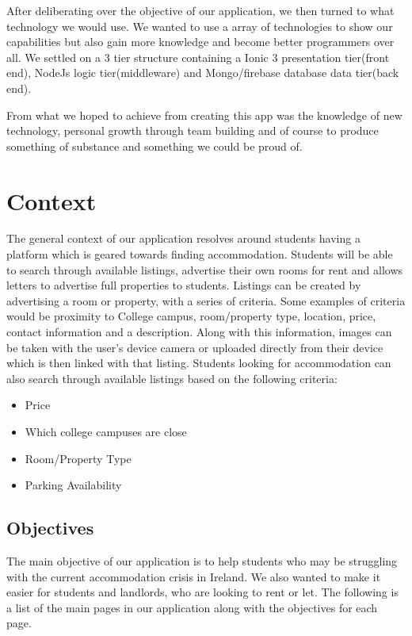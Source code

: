 After deliberating over the objective of our application, we then turned to what technology we would use. We wanted to use a array of technologies to show our capabilities but also gain more knowledge and become better programmers over all. We settled on a 3 tier structure containing a Ionic 3 presentation tier(front end), NodeJs logic tier(middleware)  and Mongo/firebase database data tier(back end).

From what we hoped to achieve from creating this app was the knowledge of new technology, personal growth through team building and of course to produce something of substance and something we could be proud of.

\chapter{Context}
The general context of our application resolves around students having a platform which is geared towards finding accommodation. Students will be able to search through available listings, advertise their own rooms for rent and allows letters to advertise full properties to students. Listings can be created by advertising a room or property, with a series of criteria. Some examples of criteria would be proximity to College campus, room/property type, location, price, contact information and a description. Along with this information, images can be taken with the user’s device camera or uploaded directly from their device which is then linked with that listing. Students looking for accommodation can also search through available listings based on the following criteria: 

\begin{itemize}
  \item Price
  \item Which college campuses are close
  \item Room/Property Type
  \item Parking Availability
\end{itemize}

\section{Objectives}
The main objective of our application is to help students who may be struggling with the current accommodation crisis in Ireland. We also wanted to make it easier for students and landlords, who are looking to rent or let. The following is a list of the main pages in our application along with the objectives for each page. 


